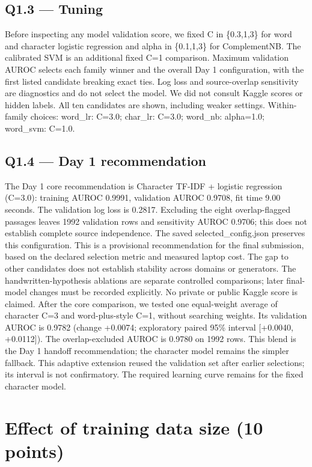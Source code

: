 \subsection*{Q1.3 --- Tuning}

Before inspecting any model validation score, we fixed C in \{0.3,1,3\} for word and character logistic regression and alpha in \{0.1,1,3\} for ComplementNB. The calibrated SVM is an additional fixed C=1 comparison. Maximum validation AUROC selects each family winner and the overall Day 1 configuration, with the first listed candidate breaking exact ties. Log loss and source-overlap sensitivity are diagnostics and do not select the model. We did not consult Kaggle scores or hidden labels. All ten candidates are shown, including weaker settings. Within-family choices: word\_lr: C=3.0; char\_lr: C=3.0; word\_nb: alpha=1.0; word\_svm: C=1.0.

\subsection*{Q1.4 --- Day 1 recommendation}

The Day 1 core recommendation is Character TF-IDF + logistic regression (C=3.0): training AUROC 0.9991, validation AUROC 0.9708, fit time 9.00 seconds. The validation log loss is 0.2817. Excluding the eight overlap-flagged passages leaves 1992 validation rows and sensitivity AUROC 0.9706; this does not establish complete source independence. The saved selected\_config.json preserves this configuration. This is a provisional recommendation for the final submission, based on the declared selection metric and measured laptop cost. The gap to other candidates does not establish stability across domains or generators. The handwritten-hypothesis ablations are separate controlled comparisons; later final-model changes must be recorded explicitly. No private or public Kaggle score is claimed. After the core comparison, we tested one equal-weight average of character C=3 and word-plus-style C=1, without searching weights. Its validation AUROC is 0.9782 (change +0.0074; exploratory paired 95\% interval [+0.0040, +0.0112]). The overlap-excluded AUROC is 0.9780 on 1992 rows. This blend is the Day 1 handoff recommendation; the character model remains the simpler fallback. This adaptive extension reused the validation set after earlier selections; its interval is not confirmatory. The required learning curve remains for the fixed character model.

\section{Effect of training data size (10 points)}

